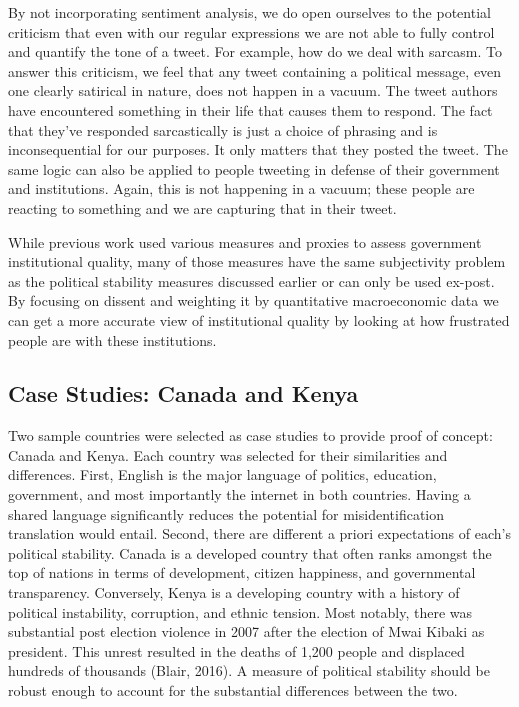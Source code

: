 \documentclass[12pt]{article}
\begin{document}
\begin{spacing}{1.5}
By not incorporating sentiment analysis, we do open ourselves to the potential criticism that even with our regular expressions we are not able to fully control and quantify the tone of a tweet. For example, how do we deal with sarcasm. To answer this criticism, we feel that any tweet containing a political message, even one clearly satirical in nature, does not happen in a vacuum. The tweet authors have encountered something in their life that causes them to respond. The fact that they've responded sarcastically is just a choice of phrasing and is inconsequential for our purposes. It only matters that they posted the tweet. The same logic can also be applied to people tweeting in defense of their government and institutions. Again, this is not happening in a vacuum; these people are reacting to something and we are capturing that in their tweet.




While previous work used various measures and proxies to assess government institutional quality, many of those measures have the same subjectivity problem as the political stability measures discussed earlier or can only be used ex-post. By focusing on dissent and weighting it by quantitative macroeconomic data we can get a more accurate view of institutional quality by looking at how frustrated people are with these institutions. 





\subsection*{Case Studies: Canada and Kenya}

Two sample countries were selected as case studies to provide proof of concept: Canada and Kenya. Each country was selected for their similarities and differences. First, English is the major language of politics, education, government, and most importantly the internet in both countries. Having a shared language significantly reduces the potential for misidentification translation would entail. Second, there are different a priori expectations of each’s political stability. Canada is a developed country that often ranks amongst the top of nations in terms of development, citizen happiness, and governmental transparency. Conversely, Kenya is a developing country with a history of political instability, corruption, and ethnic tension. Most notably, there was substantial post election violence in 2007 after the election of Mwai Kibaki as president. This unrest resulted in the deaths of 1,200 people and displaced hundreds of thousands (Blair, 2016). A measure of political stability should be robust enough to account for the substantial differences between the two.  


\end{spacing}
\end{document}
